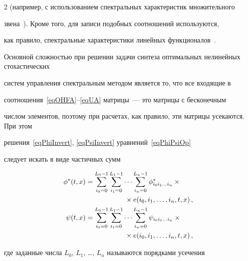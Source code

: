 \begin{multicols}{2}
(например, с использованием спектральных характеристик множительного 


звена~\cite{SolSem, PanRybSot}). Кроме того, для записи подобных соотношений используются, 


как правило, спектральные характеристики линейных функционалов~\cite{PanRybSot, Ryb_Func}.





Основной сложностью при решении задачи синтеза оптимальных нелинейных стохастических 


сис\-тем управления спектральным методом является то, что все входящие в 


соотношения~\eqref{eqOHFA}--\eqref{eqUA} мат\-ри\-цы~--- это мат\-ри\-цы с бесконечным 


числом элементов, поэтому при расчетах, как правило, эти матрицы усекаются. При этом 


решения~\eqref{eqPhiInvert}, \eqref{eqPsiInvert} уравнений~\eqref{eqPhiPsiOp} 


следует искать в виде частичных сумм





\noindent


\begin{align}


\label{eqPhiInvertTr}


  \phi^*(t,x) &= \sum\limits_{i_0 = 0}^{L_0 - 1} \sum\limits_{i_1 = 0}^{L_1 - 1} \dots 


  \sum\limits_{i_n = 0}^{L_n - 1} \phi^*_{i_0 i_1 \dots i_n} \times{}\notag\\


&  \hspace*{20mm}{}\times e(i_0,i_1,\dots,i_n,t,x)\,,


\\


\label{eqPsiInvertTr}


  \psi(t,x) &= \sum\limits_{i_0 = 0}^{L_0 - 1} \sum\limits_{i_1 = 0}^{L_1 - 1} \dots 


  \sum\limits_{i_n = 0}^{L_n - 1} \psi_{i_0 i_1 \dots i_n} \times{}\notag\\


&  \hspace*{20mm}{}\times e(i_0,i_1,\dots,i_n,t,x)\,,


\end{align}


где заданные числа $L_0$, $L_1$, \dots, $L_n$ называются порядками усечения 



\end{multicols}
